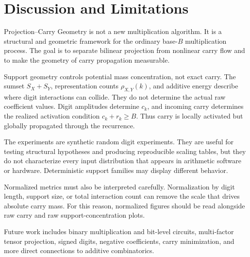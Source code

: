 \section{Discussion and Limitations}

Projection--Carry Geometry is not a new multiplication algorithm. It is a
structural and geometric framework for the ordinary base-\(B\) multiplication
process. The goal is to separate bilinear projection from nonlinear carry flow
and to make the geometry of carry propagation measurable.

Support geometry controls potential mass concentration, not exact carry. The
sumset \(S_X+S_Y\), representation counts \(\rho_{X,Y}(k)\), and additive
energy describe where digit interactions can collide. They do not determine
the actual raw coefficient values. Digit amplitudes determine \(c_k\), and
incoming carry determines the realized activation condition \(c_k+r_k\ge B\).
Thus carry is locally activated but globally propagated through the recurrence.

The experiments are synthetic random digit experiments. They are useful for
testing structural hypotheses and producing reproducible scaling tables, but
they do not characterize every input distribution that appears in arithmetic
software or hardware. Deterministic support families may display different
behavior.

Normalized metrics must also be interpreted carefully. Normalization by digit
length, support size, or total interaction count can remove the scale that
drives absolute carry mass. For this reason, normalized figures should be read
alongside raw carry and raw support-concentration plots.

Future work includes binary multiplication and bit-level circuits,
multi-factor tensor projection, signed digits, negative coefficients, carry
minimization, and more direct connections to additive combinatorics.
